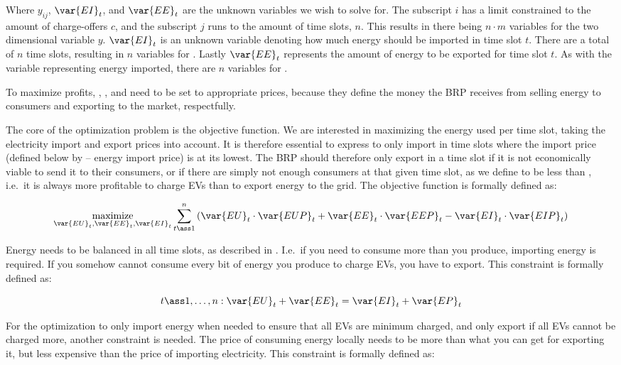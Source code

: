Where $y_{ij}$, $\var{EI}_t$, and $\var{EE}_t$ are the unknown variables we wish to solve for. The subscript $i$ has a limit constrained to the amount of charge-offers $c$, and the subscript $j$ runs to the amount of time slots, $n$. This results in there being $n \cdot m$ variables for the two dimensional variable $y$. $\var{EI}_t$ is an unknown variable denoting how much energy should be imported in time slot $t$. There are a total of $n$ time slots, resulting in $n$ variables for . Lastly $\var{EE}_t$ represents the amount of energy to be exported for time slot $t$. As with the variable representing energy imported, there are $n$ variables for .

To maximize profits, , , and  need to be set to appropriate prices, because they define the money the BRP receives from selling energy to consumers and exporting to the market, respectfully.

The core of the optimization problem is the objective function. We are interested in maximizing the energy used per time slot, taking the electricity import and export prices into account. It is therefore essential to express to only import in time slots where the import price (defined below by  -- energy import price) is at its lowest. The BRP should therefore only export in a time slot if it is not economically viable to send it to their consumers, or if there are simply not enough consumers at that given time slot, as we define  to be less than , i.e.\ it is always more profitable to charge EVs than to export energy to the grid. The objective function is formally defined as:

\[
  \underset{\var{EU}_t, \var{EE}_t, \var{EI}_t}{\operatorname{maximize}} \sum_{t \ass 1}^n \left(\var{EU}_t \cdot \var{EUP}_t + \var{EE}_t \cdot \var{EEP}_t - \var{EI}_t \cdot \var{EIP}_t\right)
\]

Energy needs to be balanced in all time slots, as described in . I.e.\ if you need to consume more than you produce, importing energy is required. If you somehow cannot consume every bit of energy you produce to charge EVs, you have to export. This constraint is formally defined as:

\[
  t \ass 1, \dots, n : \var{EU}_t + \var{EE}_t = \var{EI}_t + \var{EP}_t
\]

For the optimization to only import energy when needed to ensure that all EVs are minimum charged, and only export if all EVs cannot be charged more, another constraint is needed. The price of consuming energy locally needs to be more than what you can get for exporting it, but less expensive than the price of importing electricity. This constraint is formally defined as:

